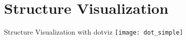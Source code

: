 \section{Structure Visualization}


\begin{frame}[c]{Structure Visualization with dotviz}
    \centering
    \texttt{[image: dot\_simple]}
\end{frame}
